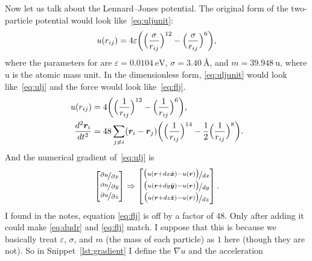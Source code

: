 Now let us talk about the Lennard--Jones potential.
The original form of the two-particle potential would look like~\eqref{eq:uljunit}:
%
\begin{equation}\label{eq:uljunit}
    u(r_{ij}) = 4 \varepsilon \biggl( \Bigl( \frac{ \sigma }{ r_{ij} } \Bigr)^{12}
    -\Bigl( \frac{ \sigma }{ r_{ij} } \Bigr)^6 \biggr),
\end{equation}
%
where the parameters for  are $\varepsilon = \SI{0.0104}{\electronvolt}$,
$\sigma = \SI{3.40}{\angstrom}$, and $m = \SI{39.948}{\atomicmassunit}$, where
$\si{\atomicmassunit}$ is the atomic mass unit.
In the dimensionless form,
\eqref{eq:uljunit} would look like~\eqref{eq:ulj} and the force would
look like~\eqref{eq:flj}.
%
\begin{align}
    u(r_{ij})                      & = 4 \biggl( \Bigl( \frac{ 1 }{ r_{ij} } \Bigr)^{12}
    -\Bigl( \frac{ 1 }{ r_{ij} } \Bigr)^6 \biggr), \label{eq:ulj}                        \\
    \frac{ d^2 \bm{r}_i }{ d t^2 } & = 48\sum_{j \neq i} (\bm{r}_i - \bm{r}_j)
    \biggl( \Bigl( \frac{ 1 }{ r_{ij} } \Bigr)^{14}
    -\frac{ 1 }{ 2 } \Bigl( \frac{ 1 }{ r_{ij} } \Bigr)^8 \biggr). \label{eq:flj}
\end{align}
%
And the numerical gradient of~\eqref{eq:ulj} is
%
\begin{equation}\label{eq:dudr}
    \begin{bmatrix}
        \nicefrac{ \partial u }{ \partial x } \\
        \nicefrac{ \partial u }{ \partial y } \\
        \nicefrac{ \partial u }{ \partial z }
    \end{bmatrix}
    \Rightarrow
    \begin{bmatrix}
        \nicefrac{ \big( u(\bm{r} + dx \hat{\bm{x}}) - u(\bm{r}) \big) }{ dx } \\
        \nicefrac{ \big( u(\bm{r} + dy \hat{\bm{y}}) - u(\bm{r}) \big) }{ dy } \\
        \nicefrac{ \big( u(\bm{r} + dz \hat{\bm{z}}) - u(\bm{r}) \big) }{ dz }
    \end{bmatrix}.
\end{equation}
%
I found in the notes, equation \eqref{eq:flj} is off by a factor of $48$.
Only after adding it could make \eqref{eq:dudr} and \eqref{eq:flj} match.
I suppose that this is because we basically treat
$\varepsilon$, $\sigma$, and $m$ (the mass of each particle) as $1$ here (though they
are not). So in Snippet~\ref{lst:gradient} I define the $\nabla u$ and the acceleration

